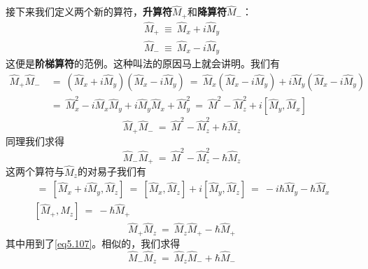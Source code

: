 \documentclass[12pt,a4paper,openany]{ctexbook}
\begin{document}
\begin{flushleft}
接下来我们定义两个新的算符，\textbf{升算符}$\hat{M}_+$和\textbf{降算符}$\hat{M}_-$：
\begin{gather}
    \hat{M}_+\ \equiv\ \hat{M}_x+i\hat{M}_y \label{eq5.110} \\
    \hat{M}_-\ \equiv\ \hat{M}_x-i\hat{M}_y
\end{gather}
这便是\textbf{阶梯算符}的范例。这种叫法的原因马上就会讲明。我们有
\begin{align*}
    \hat{M}_+\hat{M}_-\ &=\ (\hat{M}_x+i\hat{M}_y)(\hat{M}_x-i\hat{M}_y)\ =\ \hat{M}_x(\hat{M}_x-i\hat{M}_y)+i\hat{M}_y(\hat{M}_x-i\hat{M}_y) \\
    &=\ \hat{M}_x^2-i\hat{M}_x\hat{M}_y+i\hat{M}_y\hat{M}_x+\hat{M}_y^2\ =\ \hat{M}^2-\hat{M}_z^2+i[\hat{M}_y,\hat{M}_x]
\end{align*}
\begin{equation}
    \hat{M}_+\hat{M}_-\ =\ \hat{M}^2-\hat{M}_z^2+\hbar\hat{M}_z \label{eq5.112}
\end{equation}
同理我们求得
\begin{equation}
    \hat{M}_-\hat{M}_+\ =\ \hat{M}^2-\hat{M}_z^2-\hbar\hat{M}_z \label{eq5.113}
\end{equation}
这两个算符与$\hat{M}_z$的对易子我们有
\begin{gather*}
    [\hat{M}_+,\hat{M}_z]\ =\ [\hat{M}_x+i\hat{M}_y,\hat{M}_z]\ =\ [\hat{M}_x,\hat{M}_z]+i[\hat{M}_y,\hat{M}_z]\ =\ -i\hbar\hat{M}_y-\hbar\hat{M}_x \\
    [\hat{M}_+,\hat{M}_z]\ =\ -\hbar\hat{M}_+
\end{gather*}
\begin{equation}
    \hat{M}_+\hat{M}_z\ =\ \hat{M}_z\hat{M}_+-\hbar\hat{M}_+ \label{eq5.114}
\end{equation}
其中用到了\eqref{eq5.107}。相似的，我们求得
\begin{equation}
    \hat{M}_-\hat{M}_z\ =\ \hat{M}_z\hat{M}_-+\hbar\hat{M}_- \label{eq5.115}
\end{equation}


\end{flushleft}
\end{document}

